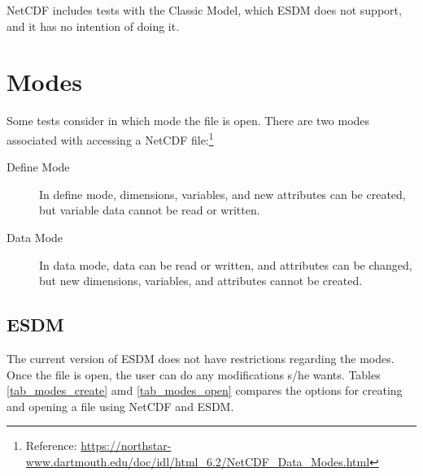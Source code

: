 \tab
NetCDF includes tests with the Classic Model, which ESDM does not support, and it has no intention of doing it.

\section{Modes}

\tab
Some tests consider in which mode the file is open. There are two modes associated with accessing a NetCDF file:\footnote{Reference: \url{https://northstar-www.dartmouth.edu/doc/idl/html_6.2/NetCDF_Data_Modes.html}}

\begin{description}

\item[Define Mode] In define mode, dimensions, variables, and new attributes can be created, but variable data cannot be read or written.

\item[Data Mode] In data mode, data can be read or written, and attributes can be changed, but new dimensions, variables, and attributes cannot be created.

\end{description}

\subsection{ESDM}

\tab
The current version of ESDM does not have restrictions regarding the modes. Once the file is open, the user can do any modifications s/he wants. Tables \ref{tab_modes_create} amd \ref{tab_modes_open} compares the options for creating and opening a file using NetCDF and ESDM.

